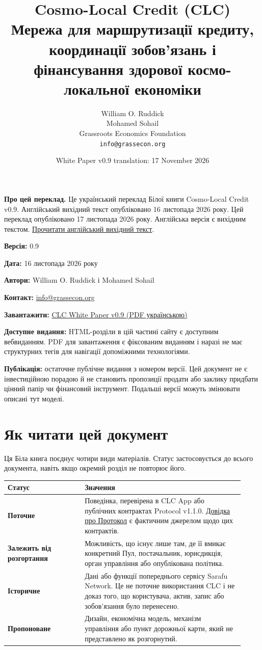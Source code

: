 \documentclass[11pt]{article}
\title{Cosmo-Local Credit (CLC)\\Мережа для маршрутизації кредиту, координації зобов'язань і фінансування здорової космо-локальної економіки}
\author{William O. Ruddick \\ Mohamed Sohail \\ Grassroots Economics Foundation \\ \texttt{info@grassecon.org}}
\date{White Paper v0.9 translation: 17 November 2026}
\begin{document}
\maketitle
\tableofcontents
\newpage
\sloppy
\RaggedRight

\textbf{Про цей переклад.} Це український переклад Білої книги Cosmo-Local Credit v0.9. Англійський вихідний текст опубліковано 16 листопада 2026 року. Цей переклад опубліковано 17 листопада 2026 року. Англійська версія є вихідним текстом. \href{https://docs.cosmolocal.credit/white-paper}{Прочитати англійський вихідний текст}.

\textbf{Версія:} 0.9

\textbf{Дата:} 16 листопада 2026 року

\textbf{Автори:} William O. Ruddick і Mohamed Sohail

\textbf{Контакт:} \href{mailto:info@grassecon.org}{info@grassecon.org}

\textbf{Завантажити:} \href{https://docs.cosmolocal.credit/white-paper/Cosmo-Local-Credit-CLC-White-Paper-v9-uk.pdf}{CLC White Paper v0.9 (PDF українською)}

\textbf{Доступне видання:} HTML-розділи в цій частині сайту є доступним вебвиданням. PDF для завантаження є фіксованим виданням і наразі не має структурних тегів для навігації допоміжними технологіями.

\textbf{Публікація:} остаточне публічне видання з номером версії. Цей документ не є інвестиційною порадою й не становить пропозиції продати або заклику придбати цінний папір чи фінансовий інструмент. Подальші версії можуть змінювати описані тут моделі.

\section*{Як читати цей документ}

Ця Біла книга поєднує чотири види матеріалів. Статус застосовується до всього документа, навіть якщо окремий розділ не повторює його.

\begin{longtable}{P{0.30\linewidth} P{0.62\linewidth}}
\toprule
Статус & Значення \\
\midrule
\endhead
\textbf{Поточне} & Поведінка, перевірена в CLC App або публічних контрактах Protocol v1.1.0. \href{https://docs.cosmolocal.credit/uk/protocol/overview}{Довідка про Протокол} є фактичним джерелом щодо цих контрактів. \\
\textbf{Залежить від розгортання} & Можливість, що існує лише там, де її вмикає конкретний Пул, постачальник, юрисдикція, орган управління або опублікована політика. \\
\textbf{Історичне} & Дані або функції попереднього сервісу Sarafu Network. Це не поточне використання CLC і не доказ того, що користувача, актив, запис або зобов'язання було перенесено. \\
\textbf{Пропоноване} & Дизайн, економічна модель, механізм управління або пункт дорожньої карти, який не представлено як розгорнутий. \\
\bottomrule
\end{longtable}
\end{document}
